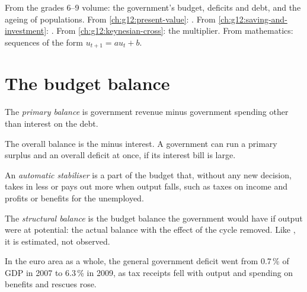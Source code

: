 \begin{recall}
From the grades 6--9 volume: the government's budget, deficits and debt, and the ageing of populations. From \cref{ch:g12:present-value}: . From
\cref{ch:g12:saving-and-investment}: . From \cref{ch:g12:keynesian-cross}: the multiplier. From mathematics: sequences of the form $u_{t+1} = a u_t + b$.
\end{recall}

\section{The budget balance}\label{sec:g12:fiscal-policy-and-debt:balance}

\begin{definition}\label{def:g12:fiscal-policy-and-debt:primary-balance}
The \emph{primary balance} is government revenue minus government spending other than interest on the debt.
\end{definition}

The overall balance is the  minus interest. A government can run a primary surplus and an overall deficit at once, if its interest bill is large.

\begin{definition}\label{def:g12:fiscal-policy-and-debt:automatic-stabiliser}
An \emph{automatic stabiliser} is a part of the budget that, without any new decision, takes in less or pays out more when output falls, such as
taxes on income and profits or benefits for the unemployed.
\end{definition}

\begin{definition}\label{def:g12:fiscal-policy-and-debt:structural-balance}
The \emph{structural balance} is the budget balance the government would have if output were at potential: the actual balance with the effect of
the cycle removed. Like , it is estimated, not observed.
\end{definition}

In the euro area as a whole, the general government deficit went from 0.7\,\% of GDP in 2007 to 6.3\,\% in 2009, as tax receipts fell with output and spending on
benefits and rescues rose.

